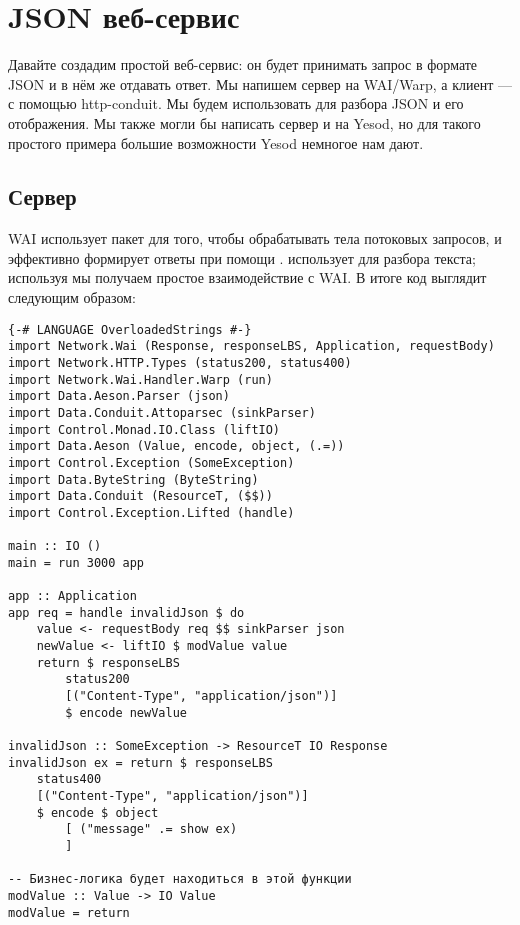 \chapter {JSON веб-сервис}\label{chap:json_web_service}

Давайте создадим простой веб-сервис: он будет принимать запрос в формате JSON и в нём же отдавать ответ. Мы напишем сервер на WAI/Warp, а клиент --- с помощью {http-conduit}. Мы будем использовать  для разбора JSON и его отображения. Мы также могли бы написать сервер и на Yesod, но для такого простого примера большие возможности Yesod немногое нам дают.

\section {Сервер}

WAI использует пакет  для того, чтобы обрабатывать тела потоковых запросов, и эффективно формирует ответы при помощи .  использует  для разбора текста; используя  мы получаем простое взаимодействие с WAI. В итоге код выглядит следующим образом:

\begin{lstlisting}
{-# LANGUAGE OverloadedStrings #-}
import Network.Wai (Response, responseLBS, Application, requestBody)
import Network.HTTP.Types (status200, status400)
import Network.Wai.Handler.Warp (run)
import Data.Aeson.Parser (json)
import Data.Conduit.Attoparsec (sinkParser)
import Control.Monad.IO.Class (liftIO)
import Data.Aeson (Value, encode, object, (.=))
import Control.Exception (SomeException)
import Data.ByteString (ByteString)
import Data.Conduit (ResourceT, ($$))
import Control.Exception.Lifted (handle)

main :: IO ()
main = run 3000 app

app :: Application
app req = handle invalidJson $ do
    value <- requestBody req $$ sinkParser json
    newValue <- liftIO $ modValue value
    return $ responseLBS
        status200
        [("Content-Type", "application/json")]
        $ encode newValue

invalidJson :: SomeException -> ResourceT IO Response
invalidJson ex = return $ responseLBS
    status400
    [("Content-Type", "application/json")]
    $ encode $ object
        [ ("message" .= show ex)
        ]

-- Бизнес-логика будет находиться в этой функции
modValue :: Value -> IO Value
modValue = return
\end{lstlisting}%

